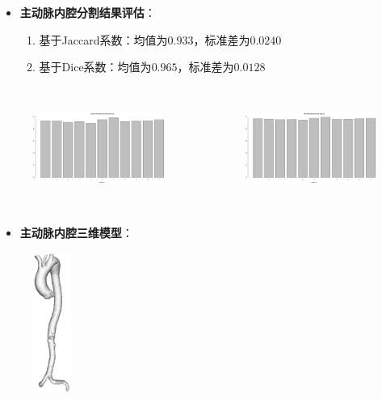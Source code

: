 \begin{frame}
\begin{itemize}
  \item \textbf{主动脉内腔分割结果评估}：
  \begin{enumerate}
    \item 基于Jaccard系数：均值为$0.933$，标准差为$0.0240$
    \item 基于Dice系数：均值为$0.965$，标准差为$0.0128$
  \end{enumerate}
\end{itemize}
\begin{columns}[b,onlytextwidth]
\begin{column}{.5\textwidth}
\begin{figure}[t]
\centering
\includegraphics[width=1.8in,height=1.3in]{../../Figures/gac/Jaccard.eps}
\end{figure}
\end{column}
\begin{column}{.5\textwidth}
\begin{figure}[t]
\centering
\includegraphics[width=1.8in,height=1.3in]{../../Figures/gac/Dice.eps}
\end{figure}
\end{column}
\end{columns}
\end{frame} 

\begin{frame}
\begin{itemize}
  \item \textbf{主动脉内腔三维模型}：
\end{itemize}
\begin{figure}[t]
\centering
\includegraphics[height=1.8in]{../../Figures/gac/model.eps}
\end{figure} 
\end{frame} 
